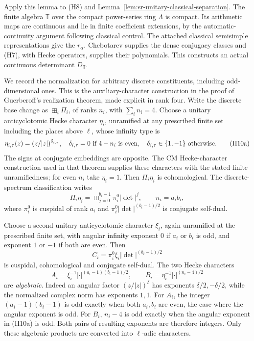 Apply this lemma to (H8) and
Lemma~\ref{lem:sr-unitary-classical-separation}.
The finite algebra \(\mathbb T\) over the compact
power-series ring \(\Lambda\) is compact.
Its arithmetic maps are continuous and lie in finite
coefficient extensions, by the automatic-continuity
argument following classical control.
The attached classical semisimple representations give
the \(r_\alpha\).
Chebotarev supplies the dense conjugacy classes and
(H7), with Hecke operators, supplies their polynomials.
This constructs an actual continuous determinant
\(D_{\mathbb T}\).

We record the normalization for arbitrary discrete constituents,
including odd-dimensional ones.
This is the auxiliary-character construction in the proof
of Guerberoff's realization theorem, made explicit in rank four.
Write the discrete base change as
\(\boxplus_i\Pi_i\), of ranks \(n_i\), with
\(\sum_i n_i=4\).
Choose a unitary anticyclotomic Hecke character \(\eta_i\),
unramified at any prescribed finite set including the
places above \(\ell\), whose infinity type is
\[
 \eta_{i,\tau}(z)=(z/|z|)^{\delta_{i,\tau}},
 \quad
 \delta_{i,\tau}=0\ \hbox{if }4-n_i\ \hbox{is even},
 \quad
 \delta_{i,\tau}\in\{1,-1\}\ \hbox{otherwise}.
 \tag{H10a}
\]
The signs at conjugate embeddings are opposite.
The CM Hecke-character construction used in that theorem
supplies these characters with the stated finite
unramifiedness; for even \(n_i\) take \(\eta_i=1\).
Then \(\Pi_i\eta_i\) is cohomological.
The discrete-spectrum classification writes
\[
       \Pi_i\eta_i
             =\boxplus_{j=0}^{b_i-1}
                         \pi_i^0|\det|^j,\qquad n_i=a_i b_i,
\]
where \(\pi_i^0\) is cuspidal of rank \(a_i\) and
\(\pi_i^0|\det|^{(b_i-1)/2}\) is conjugate self-dual.

Choose a second unitary anticyclotomic character \(\xi_i\),
again unramified at the prescribed finite set, with angular
infinity exponent \(0\) if \(a_i\) or \(b_i\) is odd,
and exponent \(1\) or \(-1\) if both are even.
Then
\[
       C_i=\pi_i^0\xi_i|\det|^{(b_i-1)/2}
\]
is cuspidal, cohomological and conjugate self-dual.
The two Hecke characters
\[
 A_i=\xi_i^{-1}|\cdot|^{(a_i-1)(b_i-1)/2},
       \qquad
 B_i=\eta_i^{-1}|\cdot|^{(n_i-4)/2}
 \tag{H10b}
\]
are \emph{algebraic}.
Indeed an angular factor \((z/|z|)^\delta\) has
exponents \(\delta/2,-\delta/2\), while the normalized
complex norm has exponents \(1,1\).
For \(A_i\), the integer
\((a_i-1)(b_i-1)\) is odd exactly when both \(a_i,b_i\)
are even, the case where the angular exponent is odd.
For \(B_i\), \(n_i-4\) is odd exactly when the angular
exponent in (H10a) is odd.
Both pairs of resulting exponents are therefore integers.
Only these algebraic products are converted into
\(\ell\)-adic characters.

